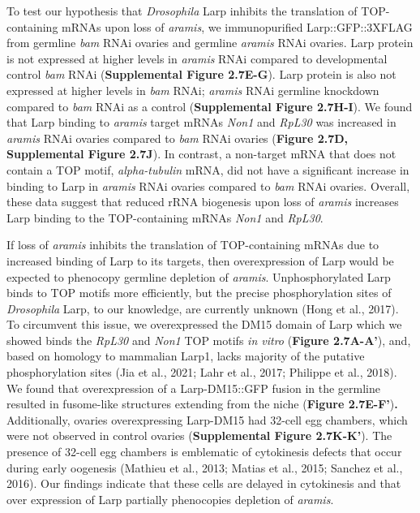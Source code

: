 \documentclass[12pt,twoside]{reedthesis}
\begin{document}
To test our hypothesis that \emph{Drosophila} Larp inhibits the translation
of TOP-containing mRNAs upon loss of \emph{aramis}, we immunopurified
Larp::GFP::3XFLAG from germline \emph{bam} RNAi ovaries and germline \emph{aramis}
RNAi ovaries. Larp protein is not expressed at higher levels in \emph{aramis}
RNAi compared to developmental control \emph{bam} RNAi (\textbf{Supplemental Figure 2.7E-G}).
Larp protein is also not expressed at higher levels in \emph{bam} RNAi;
\emph{aramis} RNAi germline knockdown compared to \emph{bam} RNAi as a control
(\textbf{Supplemental Figure 2.7H-I}). We found that Larp binding to \emph{aramis} target mRNAs
\emph{Non1} and \emph{RpL30} was increased in \emph{aramis} RNAi ovaries compared to
\emph{bam} RNAi ovaries (\textbf{Figure 2.7D, Supplemental Figure 2.7J}). In contrast, a
non-target mRNA that does not contain a TOP motif, \emph{alpha-tubulin} mRNA,
did not have a significant increase in binding to Larp in \emph{aramis} RNAi
ovaries compared to \emph{bam} RNAi ovaries. Overall, these data suggest that
reduced rRNA biogenesis upon loss of \emph{aramis} increases Larp binding to
the TOP-containing mRNAs \emph{Non1} and \emph{RpL30}.

If loss of \emph{aramis} inhibits the translation of TOP-containing mRNAs due
to increased binding of Larp to its targets, then overexpression of Larp
would be expected to phenocopy germline depletion of \emph{aramis}.
Unphosphorylated Larp binds to TOP motifs more efficiently, but the
precise phosphorylation sites of \emph{Drosophila} Larp, to our knowledge,
are currently unknown (Hong et al., 2017). To circumvent this issue, we
overexpressed the DM15 domain of Larp which we showed binds the \emph{RpL30}
and \emph{Non1} TOP motifs \emph{in vitro} (\textbf{Figure 2.7A-A'}), and, based on
homology to mammalian Larp1, lacks majority of the putative
phosphorylation sites (Jia et al., 2021; Lahr et al., 2017; Philippe et al., 2018). We found that overexpression of a
Larp-DM15::GFP fusion in the germline resulted in fusome-like structures
extending from the niche (\textbf{Figure 2.7E-F'})\textbf{.} Additionally, ovaries
overexpressing Larp-DM15 had 32-cell egg chambers, which were not
observed in control ovaries (\textbf{Supplemental Figure 2.7K-K'}). The presence of 32-cell
egg chambers is emblematic of cytokinesis defects that occur during
early oogenesis (Mathieu et al., 2013; Matias et al., 2015; Sanchez et al., 2016). Our
findings indicate that these cells are delayed in cytokinesis and that
over expression of Larp partially phenocopies depletion of \emph{aramis}.
\end{document}
